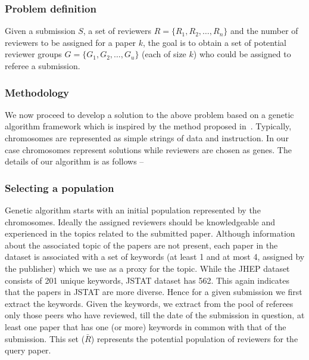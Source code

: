 \subsubsection{Problem definition} Given a submission $S$, a set of reviewers $R = \{R_1, R_2,\ldots, R_n\}$ and the number 
of reviewers to be assigned for a paper $k$, the goal is to obtain a set of potential reviewer groups $G = \{ G_1, G_2, \ldots, G_u\}$ (each of size $k$) 
who could be assigned to referee a submission.

\subsubsection{Methodology}
We now proceed to develop a solution to the above problem based on a genetic algorithm framework which is inspired by the method proposed in~\cite{ani2010method}. 
Typically, chromosomes are represented as simple
strings of data and instruction. In our case chromosomes represent solutions while reviewers are chosen as genes. The details of our algorithm is as follows -- 
\subsubsection*{Selecting a population} Genetic algorithm starts with an initial population represented by the chromosomes. 
Ideally the assigned reviewers should be knowledgeable and experienced in the topics related to the submitted paper. Although information about the associated topic of the papers are not present, each paper in the dataset is  associated with a set of keywords (at least 1 and at most 4, assigned by the publisher) which we use as a proxy for the topic. While the JHEP dataset consists of 201 unique keywords, JSTAT dataset has 562. This again indicates that the papers in JSTAT are more diverse. 
Hence for  a given 
submission we first extract the keywords. 
Given the keywords, we extract from the pool of referees only those peers who have reviewed, till the date of the submission in question, at least one paper 
that has one (or more) keywords in common with that of the submission. This set ($\bar R$) represents the potential population of reviewers for the query paper.

